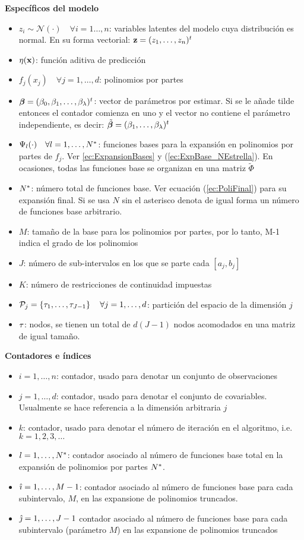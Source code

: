 \documentclass[../../Main/Main.tex]{subfiles}
\begin{document}
\textbf{Específicos del modelo}
\begin{itemize}[label={}]
	\item $z_i \sim \mathcal{N}(\cdot) \quad \forall i = 1\ldots,n$: variables latentes del modelo cuya distribución es normal. En su forma vectorial: $\mathbf{z} = (z_1,\ldots,z_n)^t$ 
	\item $\eta(\mathbf{x})$: función aditiva de predicción
	\item $f_j(x_j) \quad \forall j = 1,\ldots,d$: polinomios por partes
	\item $\bm{\beta} = (\beta_0, \beta_1,\ldots,\beta_\lambda)^t$: vector de parámetros por estimar. Si se le añade tilde entonces el contador comienza en uno y el vector no contiene el parámetro independiente, es decir: $\tilde{\bm{\beta}} = (\beta_1,\ldots,\beta_\lambda)^t$
	\item $\Psi_l(\cdot) \quad \forall l=1,\ldots,N^*$: funciones bases para la expansión en polinomios por partes de $f_j$. Ver \eqref{ec:ExpansionBases} y (\ref{ec:ExpBase_NEstrella}). En ocasiones, todas las funciones base se organizan en una matriz $\widetilde{\Phi}$
	\item $N^*$: número total de funciones base. Ver ecuación (\ref{ec:PoliFinal}) para su expansión final. Si se usa $N$ sin el asterisco denota de igual forma un número de funciones base arbitrario.
	\item $M$: tamaño de la base para los polinomios por partes, por lo tanto, M-1 indica el grado de los polinomios
	\item $J$: número de sub-intervalos en los que se parte cada $[a_j,b_j]$
	\item $K$: número de restricciones de continuidad impuestas 
	\item $\mathcal{P}_j = \left\{\tau_1,\ldots,\tau_{J-1}\right\} \quad \forall j = 1,\ldots,d$: partición del espacio de la dimensión $j$
	\item $\tau$: nodos, se tienen un total de $d(J-1)$ nodos acomodados en una matriz de igual tamaño.
\end{itemize}

\textbf{Contadores e índices}
\begin{itemize}[label={}]
	\item $i = 1,\ldots,n$: contador, usado para denotar un conjunto de observaciones
	\item $j = 1,\ldots,d$: contador, usado para denotar el conjunto de covariables. Usualmente se hace referencia a la dimensión arbitraria $j$
	\item $k$: contador, usado para denotar el número de iteración en el algoritmo, i.e. $k = 1,2,3,\ldots$
	\item $l = 1,\ldots,N^*$: contador asociado al número de funciones base total en la expansión de polinomios por partes $N^*$.
	\item $\hat{\imath} = 1,\ldots,M-1$: contador asociado al número de funciones base para cada subintervalo, $M$, en las expansione de polinomios truncados.
	\item $\hat{\jmath} = 1,\ldots,J-1$ contador asociado al número de funciones base para cada subintervalo (parámetro $M$) en las expansione de polinomios truncados
\end{itemize}
	
\end{document}
